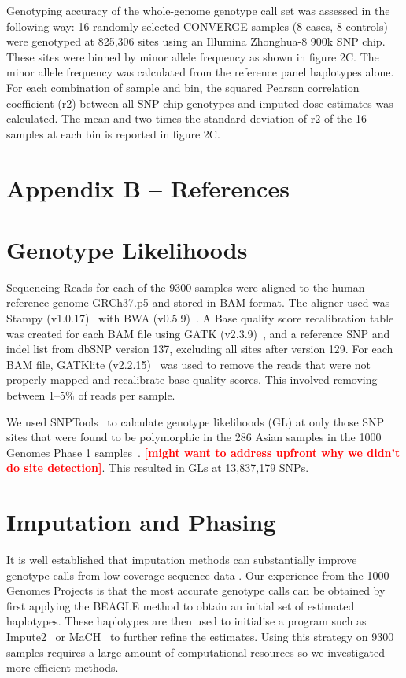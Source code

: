 \documentclass[nobib,a4paper]{tufte-handout}
\newcommand{\red}[1]{\textsf{\textbf{\textcolor{red}{[#1]}}}}
\begin{document}
Genotyping accuracy of the whole-genome genotype call set was assessed
in the following way: 16 randomly selected CONVERGE samples (8 cases,
8 controls) were genotyped at 825,306 sites using an Illumina
Zhonghua-8 900k SNP chip.  These sites were binned by minor allele
frequency as shown in figure 2C.  The minor allele frequency was
calculated from the reference panel haplotypes alone. For each
combination of sample and bin, the squared Pearson correlation
coefficient (r2) between all SNP chip genotypes and imputed dose
estimates was calculated.  The mean and two times the standard
deviation of r2 of the 16 samples at each bin is reported in figure
2C.



\section{Appendix B -- References}



\section{Genotype Likelihoods}

Sequencing Reads for each of the 9300 samples were aligned to the
human reference genome GRCh37.p5 and stored in BAM format. 
The aligner used was Stampy (v1.0.17)~\autocite{Lunter2011} with
BWA (v0.5.9)~\autocite{Li2009}. 
A Base quality score recalibration table was created for each BAM file
using GATK (v2.3.9)~\autocite{McKenna2010,Trio2011}, and a
reference SNP and indel list from dbSNP version 137, excluding all
  sites after version 129. 
For each BAM file, GATKlite (v2.2.15)~\autocite{McKenna2010,Trio2011} was
used to remove the reads that were not properly mapped and recalibrate
base quality scores. This involved removing between 1--5$\%$ of reads
per sample. 

We used SNPTools~\autocite{Wang2013} to calculate genotype likelihoods (GL) at only those
SNP sites that were found to be polymorphic in the 286 Asian samples
in the 1000 Genomes Phase 1 samples~\autocite{Project2012}. \red{might want to
  address upfront why we didn't do site detection}. This resulted in
GLs at 13,837,179 SNPs. 

\section{Imputation and Phasing}

It is well established that imputation methods can substantially
improve genotype calls from low-coverage sequence data
\autocite{Project2012, Li2010, Wang2013}.
Our experience from the 1000 Genomes Projects is that the most
accurate genotype calls can be obtained by first applying the BEAGLE
method to obtain an initial set of estimated haplotypes. These
haplotypes are then used to initialise a program such as
Impute2~\autocite{Howie2009} or MaCH~\autocite{Li2010} to further refine the
estimates. 
Using this strategy on 9300 samples requires a large amount of
computational resources so we investigated more efficient methods.  
\end{document}
